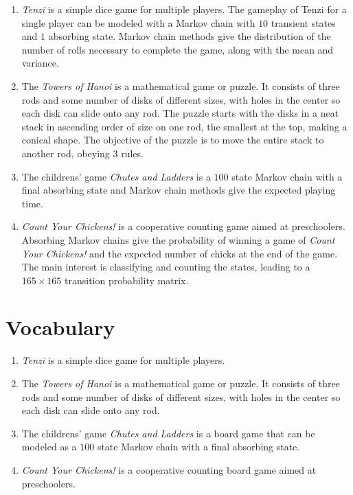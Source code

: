 \documentclass[12pt]{article}
\begin{document}
\begin{enumerate}
    \item
        \emph{Tenzi} is a simple dice game for multiple players.  The
        gameplay of Tenzi for a single player can be modeled with a
        Markov chain with \( 10 \) transient states and \( 1 \)
        absorbing state.  Markov chain methods give the distribution of
        the number of rolls necessary to complete the game, along with
        the mean and variance.
    \item
        The \emph{Towers of Hanoi} is a mathematical game or puzzle.  It
        consists of three rods and some number of disks of different
        sizes, with holes in the center so each disk can slide onto any
        rod.  The puzzle starts with the disks in a neat stack in
        ascending order of size on one rod, the smallest at the top,
        making a conical shape.  The objective of the puzzle is to move
        the entire stack to another rod, obeying \( 3 \) rules.
    \item
        The childrens' game \emph{Chutes and Ladders} is a \( 100 \)
        state Markov chain with a final absorbing state and Markov chain
        methods give the expected playing time.
    \item
        \emph{Count Your Chickens!} is a cooperative counting game aimed
        at preschoolers.  Absorbing Markov chains give the probability
        of winning a game of \emph{Count Your Chickens!} and the
        expected number of chicks at the end of the game.  The main
        interest is classifying and counting the states, leading to a \(
        165 \times 165 \) transition probability matrix.
\end{enumerate}

\hr

\section*{Vocabulary}
\begin{enumerate}
    \item
        \emph{Tenzi} is a simple dice game for multiple players.
    \item
        The \emph{Towers of Hanoi} is a mathematical game or puzzle.  It
        consists of three rods and some number of disks of different
        sizes, with holes in the center so each disk can slide onto any
        rod.
    \item
        The childrens' game \emph{Chutes and Ladders} is a board game
        that can be modeled as a \( 100 \) state Markov chain with a
        final absorbing state.
    \item
        \emph{Count Your Chickens!} is a cooperative counting board game
        aimed at preschoolers.
\end{enumerate}
\end{document}
